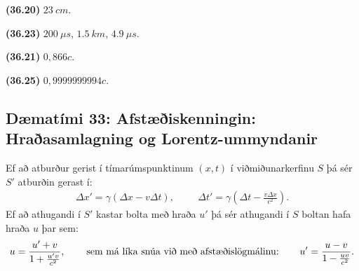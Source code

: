 \ifdefined \wholebook \else\documentclass[oneside]{book}\usepackage{EdlBook}\graphicspath{{figures/}}
\begin{document}
\begin{tcolorbox}
\begin{enumerate*}[label = ]
  \item \textbf{(36.20)} $\SI{23}{cm}$.
  \item \textbf{(36.23)} $\SI{200}{\mu s}$, $\SI{1.5}{km}$, $\SI{4.9}{\mu s}$.
  \item \textbf{(36.21)} $0,866c$.
  \item \textbf{(36.25)} $0,9999999994c$.
\end{enumerate*}
\end{tcolorbox}

\newpage

\subsection*{Dæmatími 33: Afstæðiskenningin: Hraðasamlagning og Lorentz-ummyndanir}

\begin{tcolorbox}
Ef að atburður gerist í tímarúmspunktinum $(x,t)$ í viðmiðunarkerfinu $S$ þá sér $S'$ atburðin gerast í:
\begin{align*}
    \Delta x' = \gamma \left( \Delta x - v\Delta t \right), \hspace{1cm} \Delta t' = \gamma \left( \Delta t - \frac{v\Delta x}{c^2} \right).
\end{align*}
Ef að athugandi í $S'$ kastar bolta með hraða $u'$ þá sér athugandi í $S$ boltan hafa hraða $u$ þar sem:
\begin{align*}
    u = \frac{u' + v}{1 + \frac{u' v}{c^2}}, \hspace{0.75cm} \text{sem má líka snúa við með afstæðislögmálinu:} \hspace{0.75cm} u' = \frac{u-v}{1 - \frac{uv}{c^2}}. 
\end{align*}
\end{tcolorbox}
\end{document}
